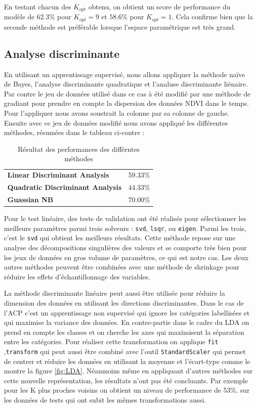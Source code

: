 \documentclass[twocolumn,10pt]{article}
\def\pycode#1{\texttt{#1}}
\begin{document}
En testant chacun des $K_{opt}$ obtenu, on obtient un score de performance du modèle de $62.3\%$ pour $K_{opt} = 9$ et $58.6\%$ pour $K_{opt} = 1$. Cela confirme bien que la seconde méthode est préférable lorsque l'espace paramétrique est très grand. 


\subsection{Analyse discriminante}
En utilisant un apprentissage supervisé, nous allons appliquer la méthode naïve de Bayes, l'analyse discriminante quadratique et l'analuse discriminante liénaire. Par contre le jeu de données utilisé dans ce cas à été modifié par une méthode de gradiant pour prendre en compte la dispersion des données NDVI dans le temps. Pour l'appliquer nous avons soustrait la colonne par sa colonne de gauche. Ensuite avec ce jeu de données modifié nous avons appliqué les différentes méthodes, résumées dans le tableau ci-contre : 

\begin{table}[h]
\caption{Résultat des performances des différntes méthodes}
\begin{tabular}[t]{l|l}
 \textbf{Linear Discriminant Analysis} &   59.33\%\\
 \textbf{Quadratic Discriminant Analysis} &    44.33\% \\
 \textbf{Guassian NB} &  70.00\%\\
\end{tabular}
\end{table}

Pour le test linéaire, des tests de validation ont été réalisés pour sélectionner les meilleurs paramètres parmi trois solveurs : \pycode{svd}, \pycode{lsqr}, ou \pycode{eigen}. Parmi les trois, c'est le \pycode{svd} qui obtient les meilleurs résultats. Cette méthode repose sur une analyse des décompositions singulières des valeurs et se comporte très bien pour les jeux de données en gros volume de paramètres, ce qui est notre cas. Les deux autres méthodes peuvent être combinées avec une méthode de shrinkage pour réduire les effets d'échantillonnage des variables. 

La méthode discriminante linéaire peut aussi être utilisée pour réduire la dimension des données en utilisant les directions discriminantes. Dans le cas de l'ACP c'est un apprentissage non supervisé qui ignore les catégories labellisées et qui maximise la variance des données. En contre-partie dans le cadre du LDA on prend en compte les classes et on cherche les axes qui maximisent la séparation entre les catégories. Pour réaliser cette transformation on applique \pycode{fit} ,\pycode{transform} qui peut aussi être combiné avec l'outil \pycode{StandardScaler} qui permet de centrer et réduire les données en utilisant la moyenne et l'écart-type comme le montre la figure \ref{fig:LDA}. Néanmoins même en appliquant d'autres méthodes sur cette nouvelle représentation, les résultats n'ont pas été concluants. Par exemple pour les K plus proches voisins on obtient un niveau de performance de 53\%. sur les données de tests qui ont subit les mêmes transformations aussi. 
\end{document}

